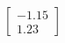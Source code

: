 \documentclass[preview]{standalone}
\begin{document}
\begin{align*}
\begin{bmatrix} -1.15 \\ 1.23 \end{bmatrix}
\end{align*}
\end{document}
